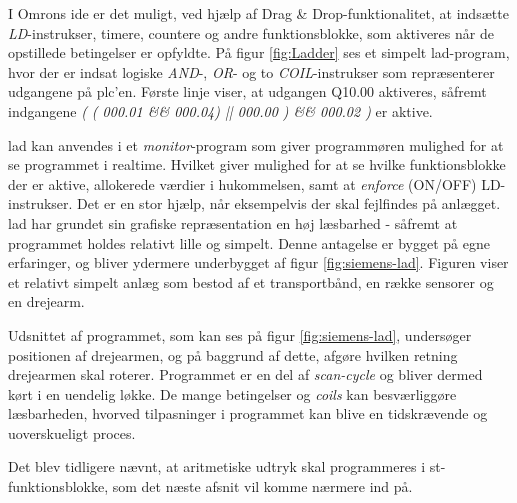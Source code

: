\noindent I Omrons \gls{ide} er det muligt, ved hjælp af Drag \& Drop-funktionalitet, at indsætte \textit{LD}-instrukser, timere, countere og andre funktionsblokke, som aktiveres når de opstillede betingelser er opfyldte. På figur \ref{fig:Ladder} ses et simpelt \gls{lad}-program, hvor der er indsat logiske \textit{AND}-, \textit{OR}- og to \textit{COIL}-instrukser som repræsenterer udgangene på \gls{plc}'en. Første linje viser, at udgangen Q10.00 aktiveres, såfremt indgangene \textit{( ( 000.01 \&\& 000.04) || 000.00 ) \&\& 000.02 )} er aktive.


\noindent \gls{lad} kan anvendes i et \textit{monitor}-program som giver programmøren mulighed for at se programmet i realtime. Hvilket giver mulighed for at se hvilke funktionsblokke der er aktive, allokerede værdier i hukommelsen, samt at \textit{enforce} (ON/OFF) LD-instrukser. Det er en stor hjælp, når eksempelvis der skal fejlfindes på anlægget.  
\gls{lad} har grundet sin grafiske repræsentation en høj læsbarhed - såfremt at programmet holdes relativt lille og simpelt. Denne antagelse er bygget på egne erfaringer, og bliver ydermere underbygget af figur \ref{fig:siemens-lad}. Figuren viser et relativt simpelt anlæg som bestod af et transportbånd, en række sensorer og en drejearm. 


\noindent Udsnittet af programmet, som kan ses på figur \ref{fig:siemens-lad}, undersøger positionen af drejearmen, og på baggrund af dette, afgøre hvilken retning drejearmen skal roterer. Programmet er en del af \textit{scan-cycle} og bliver dermed kørt i en uendelig løkke. De mange betingelser og \textit{coils} kan besværliggøre læsbarheden, hvorved tilpasninger i programmet kan blive en tidskrævende og uoverskueligt proces.

\noindent Det blev tidligere nævnt, at aritmetiske udtryk skal programmeres i \gls{st}-funktionsblokke, som det næste afsnit vil komme nærmere ind på. 

